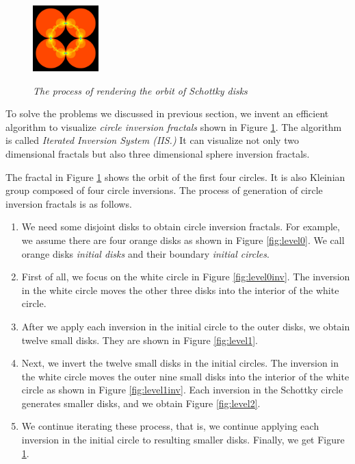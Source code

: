 \begin{figure}[htbp]
\begin{minipage}[t]{0.16\hsize}
  \subcaption{}
  \label{fig:level2}
 \end{minipage}
 \begin{minipage}[t]{0.16\hsize}
  \center
  \includegraphics[width=1in, height=1in, keepaspectratio]{img/preparation/orbit/levelMaxc.pdf}
  \subcaption{}
  \label{fig:levelMax}
 \end{minipage}
 \caption{\textit{The process of rendering the orbit of Schottky disks}}
\end{figure}

To solve the problems we discussed in previous section,
we invent an efficient algorithm to visualize \textit{circle inversion
fractals} shown in Figure \ref{fig:levelMax}. 
The algorithm is called \textit{Iterated Inversion System (IIS.)}
It can visualize not only two dimensional fractals but
also three dimensional sphere inversion fractals.

The fractal in Figure \ref{fig:levelMax} shows the orbit of the first
four circles.
It is also Kleinian group composed of four circle inversions.
The process of generation of circle inversion fractals is
as follows.

\begin{enumerate}
 \item We need some disjoint disks to obtain circle inversion fractals.
       For example, we assume there are four orange disks as shown in
       Figure \ref{fig:level0}. We call orange disks \textit{initial
       disks} and their boundary \textit{initial circles}.
 \item First of all, we focus on the white circle in Figure
       \ref{fig:level0inv}. The inversion in the white circle moves the
       other three disks into the interior of the white circle.
 \item After we apply each inversion in the initial circle to the outer disks,
       we obtain twelve small disks. They are shown in Figure \ref{fig:level1}.
 \item Next, we invert the twelve small disks in the initial circles.
       The inversion in the white circle moves the outer nine small disks
       into the interior of the white circle as shown in Figure \ref{fig:level1inv}.
       Each inversion in the Schottky circle generates smaller disks, and we
       obtain Figure \ref{fig:level2}.
 \item We continue iterating these process, that is, we continue
       applying each inversion in the initial circle to resulting
       smaller disks.
       Finally, we get Figure \ref{fig:levelMax}.
\end{enumerate}

